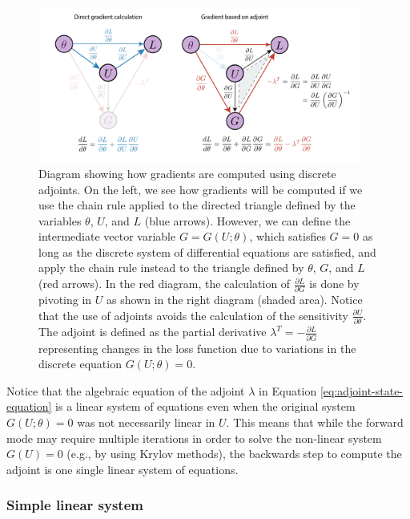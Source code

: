 \begin{figure}[t]
    \centering
    \includegraphics[width=0.95\textwidth]{figures/discrete_adjoint.pdf}
    \caption{Diagram showing how gradients are computed using discrete adjoints. On the left, we see how gradients will be computed if we use the chain rule applied to the directed triangle defined by the variables $\theta$, $U$, and $L$ (blue arrows). However, we can define the intermediate vector variable $G = G(U; \theta)$, which satisfies $G  = 0$ as long as the discrete system of differential equations are satisfied, and apply the chain rule instead to the triangle defined by $\theta$, $G$, and $L$ (red arrows). In the red diagram, the calculation of $\frac{\partial L}{\partial G}$ is done by pivoting in $U$ as shown in the right diagram (shaded area). Notice that the use of adjoints avoids the calculation of the sensitivity $\frac{\partial U}{\partial \theta}$. The adjoint is defined as the partial derivative $\lambda^T = - \frac{\partial L}{\partial G}$ representing changes in the loss function due to variations in the discrete equation $G(U; \theta) = 0$. 
    }
    \label{fig:discrete-adjoint}
\end{figure}


Notice that the algebraic equation of the adjoint $\lambda$ in Equation \eqref{eq:adjoint-state-equation} is a linear system of equations even when the original system $G(U; \theta)=0$ was not necessarily linear in $U$.
This means that while the forward mode may require multiple iterations in order to solve the non-linear system $G(U) = 0$ (e.g., by using Krylov methods), the backwards step to compute the adjoint is one single linear system of equations. 

\subsubsection{Simple linear system}

